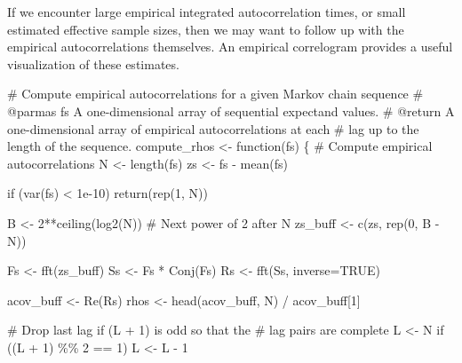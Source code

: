 \documentclass[
  letterpaper,
  DIV=11,
  numbers=noendperiod]{scrartcl}
\newenvironment{Shaded}{\begin{snugshade}}{\end{snugshade}}
\newcommand{\CommentTok}[1]{\textcolor[rgb]{0.37,0.37,0.37}{#1}}
\newcommand{\ControlFlowTok}[1]{\textcolor[rgb]{0.00,0.23,0.31}{#1}}
\newcommand{\DecValTok}[1]{\textcolor[rgb]{0.68,0.00,0.00}{#1}}
\newcommand{\FloatTok}[1]{\textcolor[rgb]{0.68,0.00,0.00}{#1}}
\newcommand{\NormalTok}[1]{\textcolor[rgb]{0.00,0.23,0.31}{#1}}
\newcommand{\OperatorTok}[1]{\textcolor[rgb]{0.37,0.37,0.37}{#1}}
\begin{document}
If we encounter large empirical integrated autocorrelation times, or
small estimated effective sample sizes, then we may want to follow up
with the empirical autocorrelations themselves. An empirical correlogram
provides a useful visualization of these estimates.

\begin{Shaded}
\begin{Highlighting}[]
\CommentTok{\# Compute empirical autocorrelations for a given Markov chain sequence}
\CommentTok{\# @parmas fs A one{-}dimensional array of sequential expectand values.}
\CommentTok{\# @return A one{-}dimensional array of empirical autocorrelations at each }
\CommentTok{\#         lag up to the length of the sequence.}
\NormalTok{compute\_rhos }\OperatorTok{\textless{}{-}}\NormalTok{ function(fs) \{}
  \CommentTok{\# Compute empirical autocorrelations}
\NormalTok{  N }\OperatorTok{\textless{}{-}}\NormalTok{ length(fs)}
\NormalTok{  zs }\OperatorTok{\textless{}{-}}\NormalTok{ fs }\OperatorTok{{-}}\NormalTok{ mean(fs)}
  
  \ControlFlowTok{if}\NormalTok{ (var(fs) }\OperatorTok{\textless{}} \FloatTok{1e{-}10}\NormalTok{)}
    \ControlFlowTok{return}\NormalTok{(rep(}\DecValTok{1}\NormalTok{, N))}

\NormalTok{  B }\OperatorTok{\textless{}{-}} \DecValTok{2}\OperatorTok{**}\NormalTok{ceiling(log2(N)) }\CommentTok{\# Next power of 2 after N}
\NormalTok{  zs\_buff }\OperatorTok{\textless{}{-}}\NormalTok{ c(zs, rep(}\DecValTok{0}\NormalTok{, B }\OperatorTok{{-}}\NormalTok{ N))}

\NormalTok{  Fs }\OperatorTok{\textless{}{-}}\NormalTok{ fft(zs\_buff)}
\NormalTok{  Ss }\OperatorTok{\textless{}{-}}\NormalTok{ Fs }\OperatorTok{*}\NormalTok{ Conj(Fs)}
\NormalTok{  Rs }\OperatorTok{\textless{}{-}}\NormalTok{ fft(Ss, inverse}\OperatorTok{=}\NormalTok{TRUE)}

\NormalTok{  acov\_buff }\OperatorTok{\textless{}{-}}\NormalTok{ Re(Rs)}
\NormalTok{  rhos }\OperatorTok{\textless{}{-}}\NormalTok{ head(acov\_buff, N) }\OperatorTok{/}\NormalTok{ acov\_buff[}\DecValTok{1}\NormalTok{]}

  \CommentTok{\# Drop last lag if (L + 1) is odd so that the}
  \CommentTok{\# lag pairs are complete}
\NormalTok{  L }\OperatorTok{\textless{}{-}}\NormalTok{ N}
  \ControlFlowTok{if}\NormalTok{ ((L }\OperatorTok{+} \DecValTok{1}\NormalTok{) }\OperatorTok{\%\%} \DecValTok{2} \OperatorTok{==} \DecValTok{1}\NormalTok{)}
\NormalTok{    L }\OperatorTok{\textless{}{-}}\NormalTok{ L }\OperatorTok{{-}} \DecValTok{1}


\end{Highlighting}
\end{Shaded}
\end{document}
